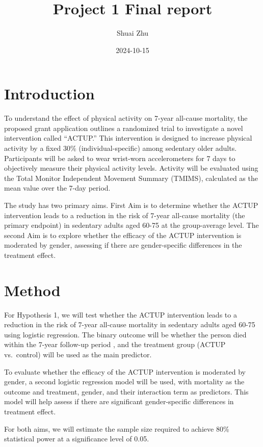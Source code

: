 \documentclass[
  12pt,
]{article}
\title{Project 1 Final report}
\author{Shuai Zhu}
\date{2024-10-15}
\begin{document}
\maketitle

\hypertarget{introduction}{%
\section{Introduction}\label{introduction}}

To understand the effect of physical activity on 7-year all-cause
mortality, the proposed grant application outlines a randomized trial to
investigate a novel intervention called ``ACTUP.'' This intervention is
designed to increase physical activity by a fixed 30\%
(individual-specific) among sedentary older adults. Participants will be
asked to wear wrist-worn accelerometers for 7 days to objectively
measure their physical activity levels. Activity will be evaluated using
the Total Monitor Independent Movement Summary (TMIMS), calculated as
the mean value over the 7-day period.

The study has two primary aims. First Aim is to determine whether the
ACTUP intervention leads to a reduction in the risk of 7-year all-cause
mortality (the primary endpoint) in sedentary adults aged 60-75 at the
group-average level. The second Aim is to explore whether the efficacy
of the ACTUP intervention is moderated by gender, assessing if there are
gender-specific differences in the treatment effect.

\hypertarget{method}{%
\section{Method}\label{method}}

For Hypothesis 1, we will test whether the ACTUP intervention leads to a
reduction in the risk of 7-year all-cause mortality in sedentary adults
aged 60-75 using logistic regression. The binary outcome will be whether
the person died within the 7-year follow-up period , and the treatment
group (ACTUP vs.~control) will be used as the main predictor.

To evaluate whether the efficacy of the ACTUP intervention is moderated
by gender, a second logistic regression model will be used, with
mortality as the outcome and treatment, gender, and their interaction
term as predictors. This model will help assess if there are significant
gender-specific differences in treatment effect.

For both aims, we will estimate the sample size required to achieve 80\%
statistical power at a significance level of 0.05.
\end{document}
